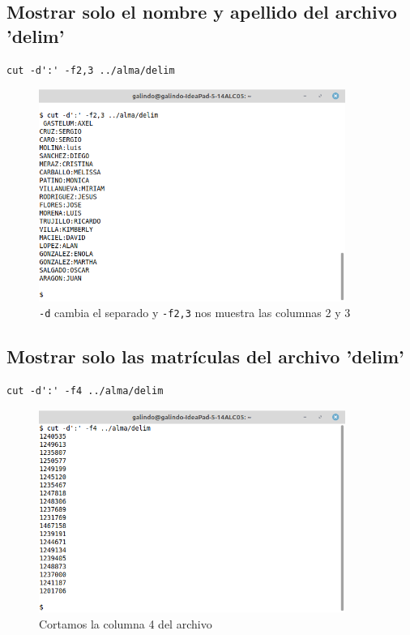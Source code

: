\documentclass[11pt]{article}
\begin{document}
\subsection{Mostrar solo el nombre y apellido del archivo 'delim'}
\label{sec:orgab2300a}
\begin{verbatim}
cut -d':' -f2,3 ../alma/delim
\end{verbatim}

\begin{figure}[htbp]
\centering
\includegraphics[width=10cm]{img/a22.png}
\caption[\texttt{-f2,3}]{\texttt{-d} cambia el separado y \texttt{-f2,3} nos muestra las columnas 2 y 3}
\end{figure}

\subsection{Mostrar solo las matrículas del archivo 'delim'}
\label{sec:org543400b}
\begin{verbatim}
cut -d':' -f4 ../alma/delim
\end{verbatim}

\begin{figure}[htbp]
\centering
\includegraphics[width=10cm]{img/a23.png}
\caption{Cortamos la columna 4 del archivo}
\end{figure}
\end{document}
